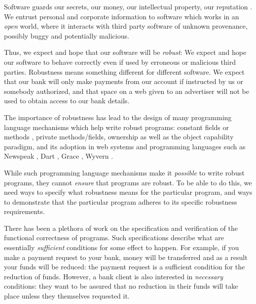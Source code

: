 Software guards our secrets, our money, our intellectual property,
our reputation \cite{covfefe}.  We entrust personal and
corporate information to software which works in an \emph{open} world, 
where  it interacts with %
third party software of unknown provenance, possibly buggy and potentially malicious.

Thus, we expect and hope that our software will be \emph{robust}:
We expect and hope our software to behave correctly even if  used 
by erroneous or malicious third parties. Robustness means 
something different for different software.
 We expect that our bank will only make payments 
from our account if instructed by us or somebody authorized\cite{ ERC20}, 
and that  space on a web given to an advertiser will not be used
to obtain access to our bank details\cite{cwe}. 

The importance of robustness has lead to the design of many programming
language mechanisms which help write robust programs:
constant fields or methods \cite{...}, private methods/fields\cite{...}, ownership\cite{ownalias}
as well as the object capability paradigm\cite{millerPhDThesis},
and its adoption in  web systems
\cite{CapJavaHayesAPLAS17,CapNetSocc17Eide,DOCaT14} and programming languages such as Newspeak
\cite{newspeak17}, Dart \cite{dart15}, Grace \cite{grace,graceClasses}, Wyvern \cite{wyverncapabilities}.

While such programming language mechanisms make it \textit{possible} to write robust
programs, they cannot \textit{ensure} that programs are robust. 
To be able to do this, we need ways to specify what robustness means for the 
particular program, and ways to demonstrate that the particular program 
adheres to its specific robustness requirements.

There has been a plethora of work on the specification and verification of the
functional correctness of programs. Such specifications describe what are
essentially \emph{sufficient} conditions for some
effect to happen. For example, if you make a payment request to your bank, money will be transferred
and as a result your funds will be reduced: the payment request is a sufficient condition for the
reduction of funds. However, a bank client is also interested in \emph{necessary} conditions:
they want to be assured that no reduction in their funds will take place unless they themselves
requested it.

